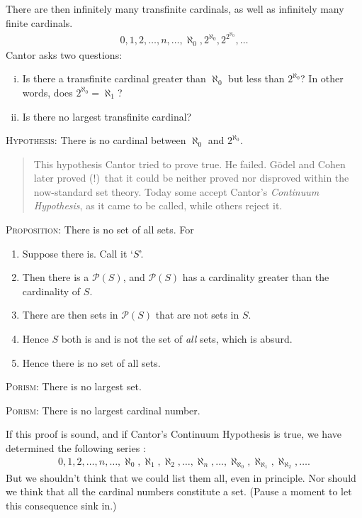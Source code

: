 \documentclass[polutonikogreek,english,twoside,openright]{article}
\begin{document}
\begin{enumerate}
  There are then infinitely many transfinite cardinals, as well as
  infinitely many finite cardinals.
  \begin{align*}
    0,1,2,\dotsc,n,\dotsc,\aleph_0,2^{\aleph_0},2^{2^{\aleph_0}},\dotsc
  \end{align*}
  Cantor asks two questions:
  \begin{enumerate}[(i)]
  \item Is there a transfinite cardinal greater than $\aleph_0$ but
    less than $2^{\aleph_0}$? In other words, does
    $2^{\aleph_0}=\aleph_1$?
  \item Is there no largest transfinite cardinal?
  \end{enumerate}
  \textsc{Hypothesis}: There is no cardinal between $\aleph_0$ and
  $2^{\aleph_0}$. \label{continuumhyp}
  \begin{quote}
    \small{This hypothesis Cantor tried to prove true. He
      failed. G\"{o}del and Cohen later proved (!)\ that it could be
      neither proved nor disproved within the now-standard set
      theory. Today some accept Cantor's \emph{Continuum Hypothesis},
      as it came to be called, while others reject it.}
  \end{quote}
  \textsc{Proposition}: There is no set of all
  sets. \label{nosetallsets} For
  \begin{enumerate}[(1)]
  \item Suppose there is. Call it `$S$'.
  \item Then there is a $\mathscr{P}(S)$, and $\mathscr{P}(S)$ has a
    cardinality greater than the cardinality of $S$.
  \item There are then sets in $\mathscr{P}(S)$ that are not sets in
    $S$.
  \item Hence $S$ both is and is not the set of \emph{all} sets, which
    is absurd.
  \item Hence there is no set of all sets.
  \end{enumerate}
  \textsc{Porism}: There is no largest set.

  \textsc{Porism}: There is no largest cardinal number.

  If this proof is sound, and if Cantor's Continuum Hypothesis is
  true, we have determined the following
  series \label{seriescardinals}:
  \begin{align*}
    0,1,2,\dotsc,n,\dotsc,\aleph_0,\aleph_1,\aleph_2,\dotsc,\aleph_n,
    \dotsc, \aleph_{\aleph_0},
    \aleph_{\aleph_1},\aleph_{\aleph_2},\ldots. 
  \end{align*}
  But we shouldn't think that we could list them all, even in
  principle. Nor should we think that all the cardinal numbers
  constitute a set. (Pause a moment to let this consequence sink in.)


\end{enumerate}
\end{document}
